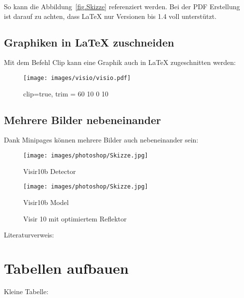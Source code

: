 So kann die Abbildung~\ref{fig.Skizze} referenziert werden. Bei der PDF Erstellung ist darauf zu achten, dass LaTeX nur Versionen bis 1.4 voll unterstützt. 



\subsection{Graphiken in LaTeX zuschneiden}\label{zuschneiden}
Mit dem Befehl Clip kann eine Graphik auch in LaTeX zugeschnitten werden:

\begin{figure}[H]
	\centering
		\texttt{[image: images/visio/visio.pdf]}  %
	\caption{clip=true, trim = 60 10 0 10}
	\label{fig.SkizzeZugeschnitten}
\end{figure}



\subsection{Mehrere Bilder nebeneinander}\label{nebeneinander}
Dank Minipages können mehrere Bilder auch nebeneinander sein:

\begin{figure}[H]
  \centering
  \begin{minipage}[b]{0.45\textwidth}
    \texttt{[image: images/photoshop/Skizze.jpg]}
    \caption{Visir10b Detector}
    \label{Visir10bDetector} 
  \end{minipage} %
  \begin{minipage}[b]{0.45\textwidth}
    \texttt{[image: images/photoshop/Skizze.jpg]} 
    \caption{Visir10b Model}
    \label{Visir10bModel} 
  \end{minipage}
  \caption{Visir 10 mit optimiertem Reflektor}
  \label{fig.Visir10b}
\end{figure}


Literaturverweis: \citep{analog_devices_dac} \citep{microchip_spi}

\section{Tabellen aufbauen}\label{tabelle}
Kleine Tabelle:

